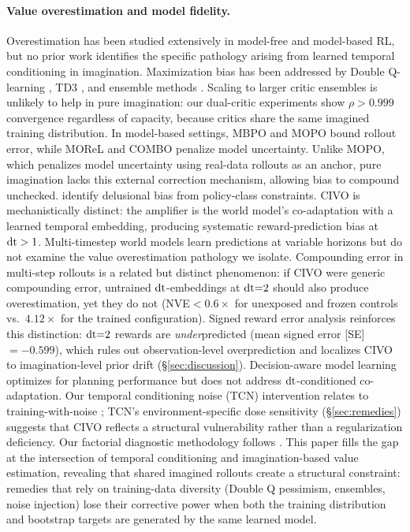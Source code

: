 \paragraph{Value overestimation and model fidelity.}
 Overestimation has been studied extensively in model-free and model-based RL, but no prior work identifies the specific pathology arising from learned temporal conditioning in imagination.
Maximization bias \citep{thrun1993issues} has been addressed by Double Q-learning \citep{vanhasselt2016double}, TD3 \citep{fujimoto2018td3}, and ensemble methods \citep{chen2021redq}. Scaling to larger critic ensembles is unlikely to help in pure imagination: our dual-critic experiments show $\rho > 0.999$ convergence regardless of capacity, because critics share the same imagined training distribution. In model-based settings, MBPO \citep{janner2019mbpo} and MOPO \citep{yu2020mopo} bound rollout error, while MOReL \citep{kidambi2020morel} and COMBO \citep{yu2021combo} penalize model uncertainty. Unlike MOPO, which penalizes model uncertainty using real-data rollouts as an anchor, pure imagination lacks this external correction mechanism, allowing bias to compound unchecked. \citet{lu2018nondelusional} identify delusional bias from policy-class constraints. CIVO is mechanistically distinct: the amplifier is the world model's co-adaptation with a learned temporal embedding, producing systematic reward-prediction bias at $\mathrm{dt} > 1$. Multi-timestep world models \citep{benechehab2023multitimestep} learn predictions at variable horizons but do not examine the value overestimation pathology we isolate. Compounding error in multi-step rollouts \citep{lambert2020objective, asadi2019combating} is a related but distinct phenomenon: if CIVO were generic compounding error, untrained $\mathrm{dt}$-embeddings at $\mathrm{dt}{=}2$ should also produce overestimation, yet they do not (NVE${<}0.6\times$ for unexposed and frozen controls vs.\ $4.12\times$ for the trained configuration). Signed reward error analysis reinforces this distinction: $\mathrm{dt}{=}2$ rewards are \emph{under}predicted (mean signed error [SE]${=}{-}0.599$), which rules out observation-level overprediction and localizes CIVO to imagination-level prior drift (\S\ref{sec:discussion}). Decision-aware model learning \citep{hamrick2021planning} optimizes for planning performance but does not address $\mathrm{dt}$-conditioned co-adaptation. Our temporal conditioning noise (TCN) intervention relates to training-with-noise \citep{bishop1995noise}; TCN's environment-specific dose sensitivity (\S\ref{sec:remedies}) suggests that CIVO reflects a structural vulnerability rather than a regularization deficiency. Our factorial diagnostic methodology follows \citet{henderson2018deep}.
This paper fills the gap at the intersection of temporal conditioning and imagination-based value estimation, revealing that shared imagined rollouts create a structural constraint: remedies that rely on training-data diversity (Double Q pessimism, ensembles, noise injection) lose their corrective power when both the training distribution and bootstrap targets are generated by the same learned model.
